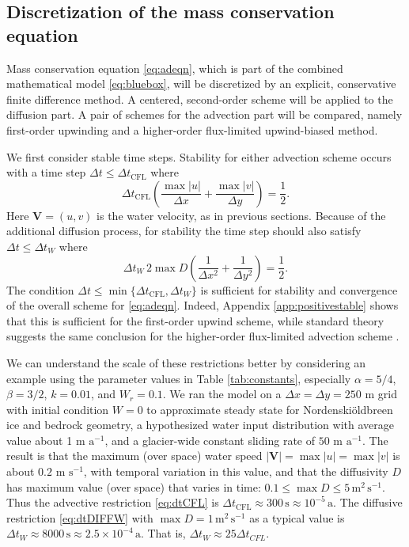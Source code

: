 \documentclass[11pt,final]{amsart}
\newcommand\bV{\mathbf{V}}
\newcommand{\Nbreen}{Nordenski\"oldbreen\xspace}
\begin{document}
\subsection*{Discretization of the mass conservation equation}  Mass conservation equation \eqref{eq:adeqn}, which is part of the combined mathematical model \eqref{eq:bluebox}, will be discretized by an explicit, conservative finite difference method.   A centered, second-order scheme will be applied to the diffusion part.  A pair of schemes for the advection part will be compared, namely first-order upwinding and a higher-order flux-limited upwind-biased method.

We first consider stable time steps.  Stability for either advection scheme occurs with a time step $\Delta t \le \Delta t_{\text{CFL}}$ where
\begin{equation}
\Delta t_{\text{CFL}} \left(\frac{\max |u|}{\Delta x} + \frac{\max |v|}{\Delta y}\right) = \frac{1}{2}. \label{eq:dtCFL}
\end{equation}
Here $\bV=(u,v)$ is the water velocity, as in previous sections.  Because of the additional diffusion process, for stability the time step should also satisfy $\Delta t \le \Delta t_{W}$  where \citep{MortonMayers}
\begin{equation}
\Delta t_W\, 2 \max D \left(\frac{1}{\Delta x^2} + \frac{1}{\Delta y^2}\right) = \frac{1}{2}. \label{eq:dtDIFFW}
\end{equation}
The condition $\Delta t \le \min\{\Delta t_{\text{CFL}}, \Delta t_W\}$ is sufficient for stability and convergence of the overall scheme for \eqref{eq:adeqn}.  Indeed, Appendix \ref{app:positivestable} shows that this is sufficient for the first-order upwind scheme, while standard theory suggests the same conclusion for the higher-order flux-limited advection scheme \citep{HundsdorferVerwer2010}.

We can understand the scale of these restrictions better by considering an example using the parameter values in Table \ref{tab:constants}, especially $\alpha=5/4$, $\beta=3/2$, $k=0.01$, and $W_r=0.1$.  We ran the model on a $\Delta x = \Delta y = 250$ m grid with initial condition $W=0$ to approximate steady state for \Nbreen ice and bedrock geometry, a hypothesized water input distribution with average value about 1 m $\text{a}^{-1}$, and a glacier-wide constant sliding rate of $50$ m $\text{a}^{-1}$.  The result is that the maximum (over space) water speed $|\bV| = \max |u| = \max |v|$ is about $0.2$ m $\text{s}^{-1}$, with temporal variation in this value, and that the diffusivity $D$ has maximum value (over space) that varies in time: $0.1 \le \max D \le 5 \,\text{m}^2\,\text{s}^{-1}$.  Thus the advective restriction \eqref{eq:dtCFL} is $\Delta t_{\text{CFL}} \approx 300\,\text{s} \approx 10^{-5}\,\text{a}$.  The diffusive restriction \eqref{eq:dtDIFFW} with $\max D=1\,\text{m}^2\,\text{s}^{-1}$ as a typical value is $\Delta t_W \approx 8000\,\text{s} \approx 2.5 \times 10^{-4}\,\text{a}$.   That is, $\Delta t_W \approx 25 \Delta t_{CFL}$.
\end{document}
